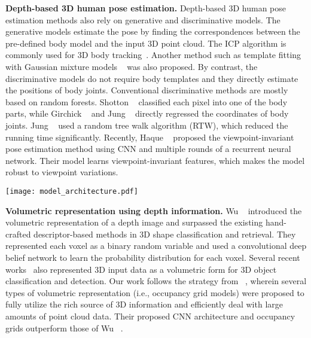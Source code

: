 \documentclass[10pt,twocolumn,letterpaper]{article}
\begin{document}
{\bf Depth-based 3D human pose estimation.} 
Depth-based 3D human pose estimation methods also rely on generative and discriminative models. The generative models estimate the pose by finding the correspondences between the pre-defined body model and the input 3D point cloud. The ICP algorithm is commonly used for 3D body tracking~\cite{ganapathi2012real,grest2005nonlinear,knoop2006sensor,helten2013personalization}. Another method such as template fitting with Gaussian mixture models ~\cite{ye2014real} was also proposed. By contrast, the discriminative models do not require body templates and they directly estimate the positions of body joints. Conventional discriminative methods are mostly based on random forests. Shotton \etal~\cite{shotton2013real} classified each pixel into one of the body parts, while Girchick \etal~\cite{girshick2011efficient} and Jung \etal~\cite{jung2016sequential} directly regressed the coordinates of body joints. Jung \etal~\cite{yub2015random} used a random tree walk algorithm (RTW), which reduced the running time significantly. Recently, Haque \etal~\cite{haque2016towards} proposed the viewpoint-invariant pose estimation method using CNN and multiple rounds of a recurrent neural network. Their model learns viewpoint-invariant features, which makes the model robust to viewpoint variations.

\begin{figure*}
\begin{center}
\texttt{[image: model\_architecture.pdf]}
\end{center}
\vspace*{-5mm}
   \caption{Overall architecture of the V2V-PoseNet. V2V-PoseNet takes voxelized input and estimates the per-voxel likelihood for each keypoint through encoder and decoder. To simplify the figure, we plotted each feature map without Z-axis and combined the 3D heatmaps of all keypoints in a single volume. Each color in the 3D heatmap indicates keypoints in the same finger.}
\vspace*{-3mm}
\label{fig:model_architecture}
\end{figure*}

{\bf Volumetric representation using depth information.}
Wu \etal~\cite{wu20153d} introduced the volumetric representation of a depth image and surpassed the existing hand-crafted descriptor-based methods in 3D shape classification and retrieval. They represented each voxel as a binary random variable and used a convolutional deep belief network to learn the probability distribution for each voxel. Several recent works~\cite{maturana2015voxnet,song2016deep} also represented 3D input data as a volumetric form for 3D object classification and detection. Our work follows the strategy from ~\cite{maturana2015voxnet}, wherein several types of volumetric representation (i.e., occupancy grid models) were proposed to fully utilize the rich source of 3D information and efficiently deal with large amounts of point cloud data. Their proposed CNN architecture and occupancy grids outperform those of Wu \etal~\cite{wu20153d}.
\end{document}
